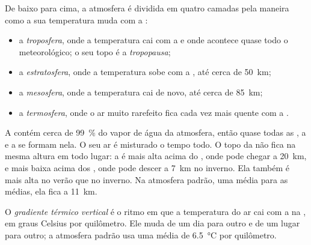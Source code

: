 \begin{definition}\label{def:g8:the-atmosphere:layers}
De baixo para cima, a atmosfera é dividida em quatro camadas pela maneira
como a sua temperatura muda com a :
\begin{itemize}
  \item a \emph{troposfera}, onde a temperatura cai com
        a  e onde acontece quase todo o  meteorológico; o seu
        topo é a \emph{tropopausa};
  \item a \emph{estratosfera}, onde a temperatura sobe
        com a , até cerca de \qty{50}{km};
  \item a \emph{mesosfera}, onde a temperatura cai de
        novo, até cerca de \qty{85}{km};
  \item a \emph{termosfera}, onde o ar muito rarefeito
        fica cada vez mais quente com a .
\end{itemize}
\end{definition}

A  contém cerca de 99~\% do vapor de água da atmosfera, então
quase todas as , a  e a  se formam nela. O seu ar é
misturado o tempo todo. O topo da  não fica na mesma altura em
todo lugar: a  é mais alta acima do , onde pode chegar a
\qty{20}{km}, e mais baixa acima dos , onde pode descer a
\qty{7}{km} no inverno. Ela também é mais alta no verão que no inverno.
Na atmosfera padrão, uma média para as  médias, ela fica a
\qty{11}{km}.

\begin{definition}\label{def:g8:the-atmosphere:lapse-rate}
O \emph{gradiente térmico vertical} é o
ritmo em que a temperatura do ar cai com a  na , em
graus Celsius por quilômetro. Ele muda de um dia para outro e de um lugar
para outro; a atmosfera padrão usa uma média de
\qty{6.5}{\degreeCelsius} por quilômetro.
\end{definition}

